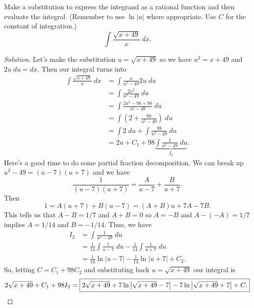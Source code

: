 \begin{problem}[WebAssign, HW 14, \# 4]
Make a substitution to express the integrand as a rational function and
then evaluate the integral. (Remember to use $\ln|u|$ where
appropriate. Use $C$ for the constant of integration.)
\[
\int\frac{\sqrt{x+49}}{x}\;dx.
\]
\end{problem}
\begin{proof}[Solution]
Let's make the substitution $u=\sqrt{x+49}$ so we have $u^2=x+49$ and
$2u\;du=dx$. Then our integral turns into
\begin{align*}
\int\frac{\sqrt{x+49}}{x}\;dx
&=\int\frac{u}{u^2-49}2u\;du\\
&=\int\frac{2u^2}{u^2-49}\;du\\
&=\int\frac{2u^2-98+98}{u^2-49}\;du\\
&=\int\left(2+\frac{98}{u^2-49}\right)\;du\\
&=\int2\;du+\int\frac{98}{u^2-49}\;du\\
&=2u+C_1+98\underbrace{\int\frac{1}{u^2-49}\;du}_{I_2}.
\end{align*}
Here's a good time to do some partial fraction decomposition. We can break
up $u^2-49=(u-7)(u+7)$ and we have
\[
\frac{1}{(u-7)(u+7)}=\frac{A}{u-7}+\frac{B}{u+7}.
\]
Then
\[
1=A(u+7)+B(u-7)=(A+B)u+7A-7B.
\]
This tells us that $A-B=1/7$ and $A+B=0$ so $A=-B$ and $A-(-A)=1/7$ implies
$A=1/14$ and $B=-1/14$. Thus, we have
\begin{align*}
I_2
&=\int\frac{1}{u^2-49}\;du\\
&=\frac{1}{14}\int\frac{1}{u-7}\;du
-\frac{1}{14}\int\frac{1}{u+7}\;du\\
&=\frac{1}{14}\ln|u-7|-\frac{1}{14}\ln|u+7|+C_2.
\end{align*}
So, letting $C=C_1+98C_2$ and substituting back $u=\sqrt{x+49}$ our
integral is
\[
2\sqrt{x+49}+C_1+98I_2=
\boxed{
2\sqrt{x+49}
+7\ln\left|\sqrt{x+49}-7\right|
-7\ln\left|\sqrt{x+49}+7\right|+C
.
}\qedhere
\]
\end{proof}

